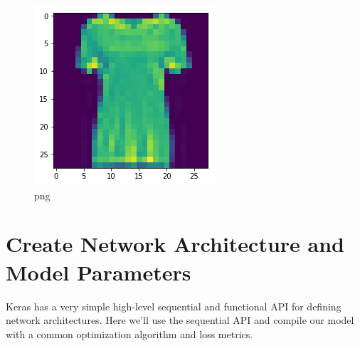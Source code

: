 \documentclass[]{book}
\newenvironment{Shaded}{\begin{snugshade}}{\end{snugshade}}
\newcommand{\DecValTok}[1]{\textcolor[rgb]{0.00,0.00,0.81}{#1}}
\newcommand{\ImportTok}[1]{#1}
\newcommand{\OperatorTok}[1]{\textcolor[rgb]{0.81,0.36,0.00}{\textbf{#1}}}
\newcommand{\NormalTok}[1]{#1}
\theoremstyle{definition}
\theoremstyle{definition}
\theoremstyle{definition}
\theoremstyle{remark}
\begin{document}
\begin{Shaded}
\end{Shaded}

\begin{figure}
\centering
\includegraphics{output_5_0.png}
\caption{png}
\end{figure}

\section{Create Network Architecture and Model
Parameters}\label{create-network-architecture-and-model-parameters}

Keras has a very simple high-level sequential and functional API for
defining network architectures. Here we'll use the sequential API and
compile our model with a common optimization algorithm and loss metrics.
\end{document}
